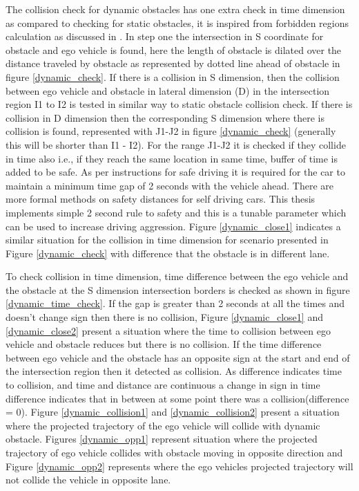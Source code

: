 The collision check for dynamic obstacles has one extra check in time dimension as compared to checking for static obstacles, it is inspired from forbidden regions calculation as discussed in \cite{graff_thesis}. In step one the intersection in S coordinate for obstacle and ego vehicle is found, here the length of obstacle is dilated over the distance traveled by obstacle as represented by dotted line ahead of obstacle in figure \ref{dynamic_check}. If there is a collision in S dimension, then the collision between ego vehicle and obstacle in lateral dimension (D) in the intersection region I1 to I2 is tested in similar way to static obstacle collision check. If there is collision in D dimension then the corresponding S dimension where there is collision is found, represented with J1-J2 in figure \ref{dynamic_check} (generally this will be shorter than I1 - I2). For the range J1-J2 it is checked if they collide in time also i.e., if they reach the same location in same time, buffer of time is added to be safe. As per instructions for safe driving it is required for the car to maintain a minimum time gap of 2 seconds with the vehicle ahead. There are more formal methods \cite{mobile_eye_safety_distance} on safety distances for self driving cars. This thesis implements simple 2 second rule to safety and this is a tunable parameter which can be used to increase driving aggression. Figure \ref{dynamic_close1} indicates a similar situation for the collision in time dimension for scenario presented in Figure \ref{dynamic_check} with difference that the obstacle is in different lane.

To check collision in time dimension, time difference between the ego vehicle and the obstacle at the S dimension intersection borders is checked as shown in figure \ref{dynamic_time_check}. If the gap is greater than 2 seconds at all the times and doesn't change sign then there is no collision, Figure \ref{dynamic_close1} and \ref{dynamic_close2} present a situation where the time to collision between ego vehicle and obstacle reduces but there is no collision. If the time difference between ego vehicle and the obstacle has an opposite sign at the start and end of the intersection region then it detected as collision. As difference indicates time to collision, and time and distance are continuous a change in sign in time difference indicates that in between at some point there was a collision(difference = 0). Figure \ref{dynamic_collision1} and \ref{dynamic_collision2} present a situation where the projected trajectory of the ego vehicle will collide with dynamic obstacle. Figures \ref{dynamic_opp1} represent situation where the projected trajectory of ego vehicle collides with obstacle moving in opposite direction and Figure \ref{dynamic_opp2} represents where the ego vehicles projected trajectory will not collide the vehicle in opposite lane.

